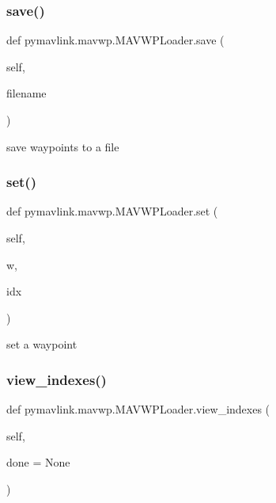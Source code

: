 \subsubsection{\texorpdfstring{save()}{save()}}
{\footnotesize\ttfamily def pymavlink.\+mavwp.\+M\+A\+V\+W\+P\+Loader.\+save (\begin{DoxyParamCaption}\item[{}]{self,  }\item[{}]{filename }\end{DoxyParamCaption})}

\begin{DoxyVerb}save waypoints to a file\end{DoxyVerb}
 \mbox{\label{classpymavlink_1_1mavwp_1_1MAVWPLoader_a7148099563199a32ccccb546115d4d24}} 
\subsubsection{\texorpdfstring{set()}{set()}}
{\footnotesize\ttfamily def pymavlink.\+mavwp.\+M\+A\+V\+W\+P\+Loader.\+set (\begin{DoxyParamCaption}\item[{}]{self,  }\item[{}]{w,  }\item[{}]{idx }\end{DoxyParamCaption})}

\begin{DoxyVerb}set a waypoint\end{DoxyVerb}
 \mbox{\label{classpymavlink_1_1mavwp_1_1MAVWPLoader_a7ca25ea7f5367931e2be4b2d6fad3385}} 
\subsubsection{\texorpdfstring{view\+\_\+indexes()}{view\_indexes()}}
{\footnotesize\ttfamily def pymavlink.\+mavwp.\+M\+A\+V\+W\+P\+Loader.\+view\+\_\+indexes (\begin{DoxyParamCaption}\item[{}]{self,  }\item[{}]{done = {\ttfamily None} }\end{DoxyParamCaption})}

